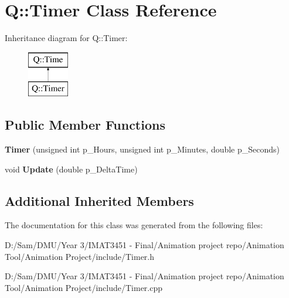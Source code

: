 \hypertarget{class_q_1_1_timer}{}\section{Q\+:\+:Timer Class Reference}
\label{class_q_1_1_timer}
Inheritance diagram for Q\+:\+:Timer\+:\begin{figure}[H]
\begin{center}
\leavevmode
\includegraphics[height=2.000000cm]{class_q_1_1_timer}
\end{center}
\end{figure}
\subsection*{Public Member Functions}
\begin{DoxyCompactItemize}
\item 
\mbox{\label{class_q_1_1_timer_acc5dc185878e189ef9de4b032dd4492b}} 
{\bfseries Timer} (unsigned int p\+\_\+\+Hours, unsigned int p\+\_\+\+Minutes, double p\+\_\+\+Seconds)
\item 
\mbox{\label{class_q_1_1_timer_a75b48f4b053cac980f84bc6ed431ca40}} 
void {\bfseries Update} (double p\+\_\+\+Delta\+Time)
\end{DoxyCompactItemize}
\subsection*{Additional Inherited Members}


The documentation for this class was generated from the following files\+:\begin{DoxyCompactItemize}
\item 
D\+:/\+Sam/\+D\+M\+U/\+Year 3/\+I\+M\+A\+T3451 -\/ Final/\+Animation project repo/\+Animation Tool/\+Animation Project/include/Timer.\+h\item 
D\+:/\+Sam/\+D\+M\+U/\+Year 3/\+I\+M\+A\+T3451 -\/ Final/\+Animation project repo/\+Animation Tool/\+Animation Project/include/Timer.\+cpp\end{DoxyCompactItemize}
